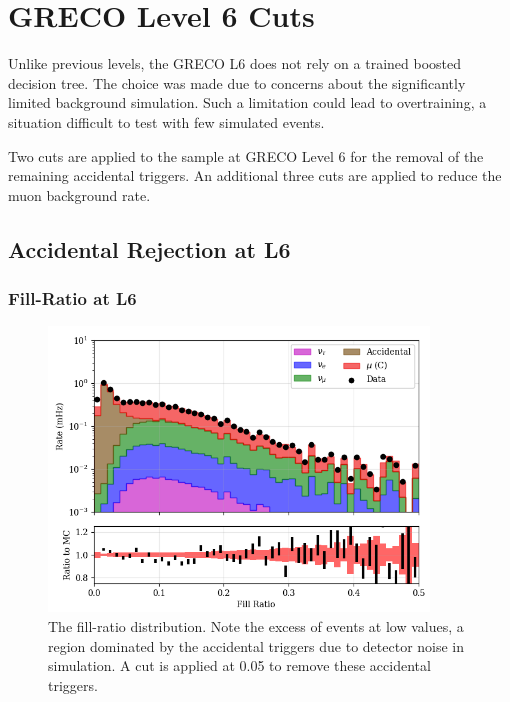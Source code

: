 \graphicspath{{chapters/greco/images/level6/}}
\label{sec:level6}

\section{GRECO Level 6 Cuts}
Unlike previous levels, the GRECO L6 does not rely on a trained boosted decision tree.
The choice was made due to concerns about the significantly limited background simulation.
Such a limitation could lead to overtraining, a situation difficult to test with few simulated events.

Two cuts are applied to the sample at GRECO Level 6 for the removal of the remaining accidental triggers.
An additional three cuts are applied to reduce the muon background rate.

\subsection{Accidental Rejection at L6}

\subsubsection{Fill-Ratio at L6}
\begin{figure}[h]
	\centering
		\includegraphics[width=0.9\textwidth]{FillRatio.png}
		\caption[Fill-Ratio]{The fill-ratio distribution. Note the excess of events at low values, a region dominated by the accidental triggers due to detector noise in simulation. A cut is applied at 0.05 to remove these accidental triggers.}
	\label{fig:fill-ratio}
\end{figure}

